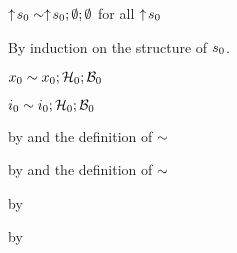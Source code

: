 \begin{lemma}\label{AT-init}
  $\uparrow\!s_0 \sim \uparrow\!s_0; \emptyset; \emptyset$
  for all\/ $\uparrow\!s_0$
\end{lemma}
\begin{lamportproof}
  By induction on the structure of $s_0$.

    \begin{pfproof}
      \qedstep
        \begin{pfproof}
          $x_0 \sim x_0; \mathcal{H}_0; \mathcal{B}_0$
        \end{pfproof}
    \end{pfproof}

    \begin{pfproof}
      \qedstep
        \begin{pfproof}
          $i_0 \sim i_0; \mathcal{H}_0; \mathcal{B}_0$
        \end{pfproof}
    \end{pfproof}

    \begin{pfproof}
      \qedstep
        \begin{pfproof}
          by \pfih and the definition of $\sim$
        \end{pfproof}
    \end{pfproof}

    \begin{pfproof}
      \qedstep
        \begin{pfproof}
          by \pfih and the definition of $\sim$
        \end{pfproof}
    \end{pfproof}

    \begin{pfproof}
      \qedstep
        \begin{pfproof}
          by \pfih
        \end{pfproof}
    \end{pfproof}

    \begin{pfproof}
      \qedstep
        \begin{pfproof}
          by \pfih
        \end{pfproof}
    \end{pfproof}


\end{lamportproof}
